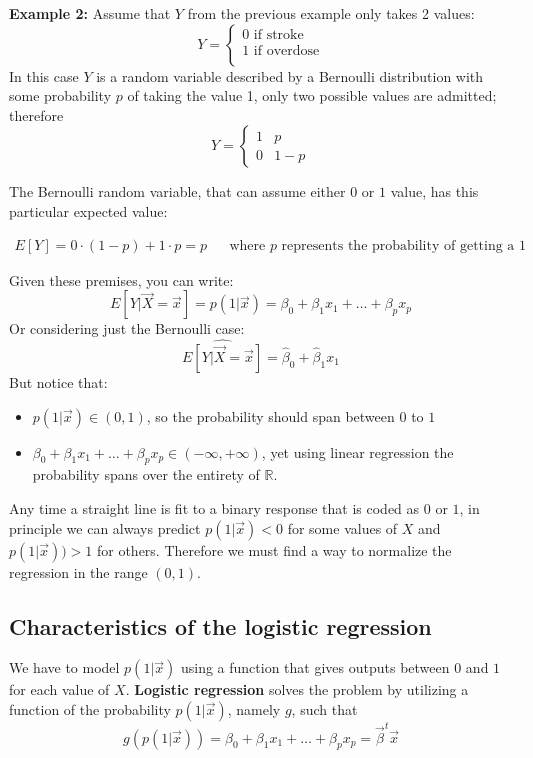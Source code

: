     \hfill

    \noindent\textbf{Example 2:} Assume that $Y$ from the previous example only takes 2
    values:
    $$
    Y = \begin{cases}
          0 \text{ if stroke} \\
	        1 \text{ if overdose} \\
        \end{cases}
    $$
    In this case $Y$ is a random variable described by a Bernoulli distribution
    with some probability $p$ of taking the value 1, only two possible values
    are admitted; therefore 
    $$
    Y = \begin{cases}
          1 & p \\
	        0 & 1-p
        \end{cases}
    $$
    
    The Bernoulli random variable, that can assume either $0$ or $1$ value, has
    this particular expected value:
    
    \begin{align*}
      E[Y] = 0 \cdot (1-p) + 1 \cdot p = p && \text{where $p$ represents the probability of getting a $1$}
    \end{align*}
     
    Given these premises, you can
    write:
    $$E[Y|\vec{X} = \vec{x}] = p(1|\vec{x}) = \beta_0 + \beta_1 x_1 + \dots +
    \beta_px_p$$ Or considering just the Bernoulli case:
    $$\hat{E[Y|\vec{X} = \vec{x}]} = \hat{\beta}_0 + \hat{\beta}_1x_1$$ But
    notice that:
    \begin{itemize}
      \item $p(1|\vec{x}) \in (0, 1)$, so the probability should span between $0$ to $1$
      \item $\beta_0 + \beta_1 x_1 + \dots + \beta_px_p \in (-\infty, +\infty)$,
      yet using linear regression the probability spans over the entirety of
      $\mathbb{R}$.
    \end{itemize}
    
	Any time a straight line is fit to a binary response that is coded as $0$ or
    $1$, in principle we can always predict $p(1 | \vec{x}) < 0$ for some values
    of $X$ and $p(1 | \vec{x})) > 1$ for others. Therefore we must find a way to
    normalize the regression in the range $(0,1)$.
    
    \subsection{Characteristics of the logistic regression}
    We have to model $p(1 | \vec{x})$ using a function that gives outputs
    between $ 0 $ and $1$ for each value of $X$. \textbf{Logistic regression}
    solves the problem by utilizing a function of the probability
    $p(1|\vec{x})$, namely $g$, such that
    $$g(p(1|\vec{x})) = \beta_0 + \beta_1 x_1 + \dots + \beta_px_p =
    \vec{\beta}^t\vec{x}$$
    
